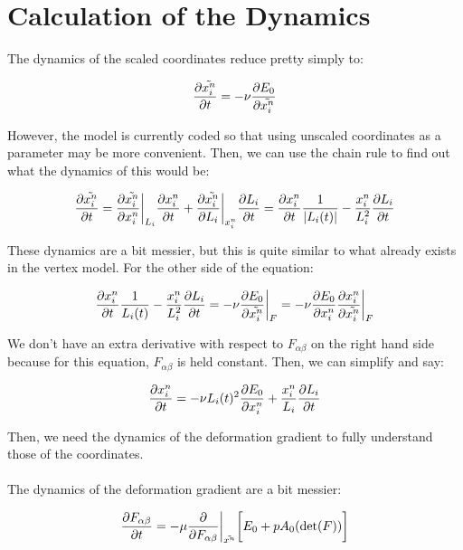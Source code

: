 \documentclass[12pt]{article}
\begin{document}
\section{Calculation of the Dynamics} 
The dynamics of the scaled coordinates reduce pretty simply to:
\begin{center}
\begin{equation}
\pdv{\tilde{x_i^n}}{t} = -\nu \pdv{E_0}{\tilde{x_i^n}}
\end{equation}
\end{center}
However, the model is currently coded so that using unscaled coordinates as a parameter may be more convenient. Then, we can use the chain rule to find out what the dynamics of this would be:
\begin{center}
\begin{equation}
\pdv{\tilde{x_i^n}}{t} = \pdv{\tilde{x_i^n}}{x_i^n}\bigg\vert_{L_i} \pdv{x_i^n}{t} + \pdv{\tilde{x_i^n}}{L_{i}}\bigg\vert_{x_i^n} \pdv{L_{i}}{t} = \pdv{x_i^n}{t} \frac{1}{|L_i(t)|} - \frac{x_i^n}{L_{i}^2} \pdv{L_{i}}{t}
\end{equation}
\end{center}
These dynamics are a bit messier, but this is quite similar to what already exists in the vertex model. For the other side of the equation: 
\begin{center}
\begin{equation}
\pdv{x_i^n}{t} \frac{1}{L_i(t)} - \frac{x_i^n}{L_{i}^2}\pdv{L_{i}}{t} = -\nu\pdv{E_0}{\tilde{x_i^n}}\bigg\vert_F = -\nu \pdv{E_0}{x_i^n} \pdv{x_i^n}{\tilde{x_i^n}}\bigg\vert_{F}
\end{equation}
\end{center} 
We don't have an extra derivative with respect to $F_{\alpha\beta}$ on the right hand side because for this equation, $F_{\alpha\beta}$ is held constant. Then, we can simplify and say:
\begin{center}
\begin{equation}
\pdv{x_i^n}{t}  = -\nu L_i(t)^2\pdv{E_0}{x_i^n} + \frac{x_i^n}{L_{i}} \pdv{L_{i}}{t}
\end{equation}
\end{center} 
Then, we need the dynamics of the deformation gradient to fully understand those of the coordinates. \\ \\
The dynamics of the deformation gradient are a bit messier:
\begin{center}
\begin{equation}
\label{eqn: dfdt}
\pdv{F_{\alpha \beta}}{t} = -\mu\pdv{F_{\alpha\beta}}\bigg\vert_{\tilde{x^n}}\bigg[ E_0 + p A_0(\det(F))\bigg]
\end{equation}
\end{center}
\end{document}
